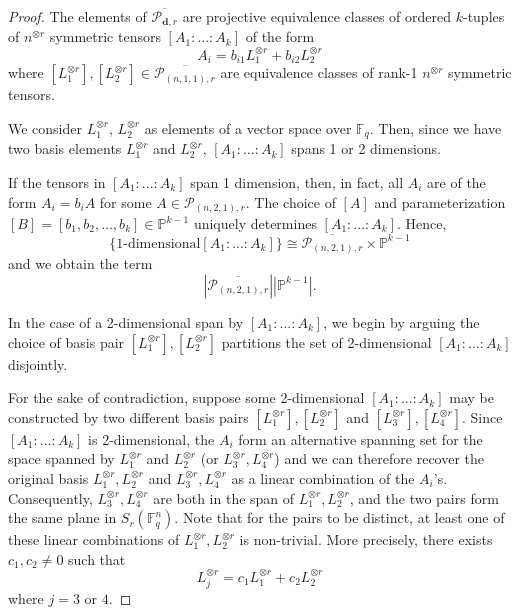 \documentclass[a4paper]{cas-sc}
\newcommand{\dd}{\mathbf{d}}    %
\newcommand{\F}{\mathbb{F}}
\begin{document}
    \begin{proof}
        The elements of $\overline{\mathcal{P}_{\dd, r}}$ are projective equivalence classes of ordered $k$-tuples of $n^{\otimes r}$ symmetric tensors $\left[A_1:...:A_k\right]$ of the form 
        $$A_i = b_{i1} L_1^{\otimes r} + b_{i2} L_2^{\otimes r}$$
        where $\left[L_1^{\otimes r}\right], \left[L_2^{\otimes r}\right] \in \overline{\mathcal{P}_{(n,1,1),r}}$ are equivalence classes of rank-1 $n^{\otimes r}$ symmetric tensors. 
    
        We consider $L_1^{\otimes r}$, $L_2^{\otimes r}$ as elements of a vector space over $\mathbb{F}_q$. Then, since we have two basis elements $L_1^{\otimes r}$ and $L_2^{\otimes r}$, $\left[A_1:...:A_k\right]$ spans 1 or 2 dimensions. 
    
        If the tensors in $\left[A_1:...:A_k\right]$ span 1 dimension, then, in fact, all $A_i$ are of the form
        $A_i = b_iA$
        for some $A \in \mathcal{P}_{(n,2,1),r}$. The choice of $\left[A\right]$ and parameterization $\left[B\right] = \left[b_1, b_2, ..., b_k\right] \in \mathbb{P}^{k-1}$ uniquely determines $\left[A_1:...:A_k\right]$. Hence, 
        $$\{\text{1-dimensional} \left[A_1:...:A_k\right]\} \cong \overline{\mathcal{P}_{(n,2,1), r}} \times \mathbb{P}^{k-1}$$ 
        and we obtain the term
        $$\left|\overline{\mathcal{P}_{(n,2,1), r}}\right| \left|\mathbb{P}^{k-1}\right|.$$
    
        In the case of a 2-dimensional span by $\left[A_1:...:A_k\right]$, we begin by arguing the choice of basis pair $\left[L_1^{\otimes r}\right],\left[L_2^{\otimes r}\right]$ partitions the set of 2-dimensional $\left[A_1:...:A_k\right]$ disjointly.
        
        For the sake of contradiction, suppose some 2-dimensional $\left[A_1:...:A_k\right]$ may be constructed by two different basis pairs $\left[L_1^{\otimes r}\right],\left[L_2^{\otimes r}\right]$ and $\left[L_3^{\otimes r}\right],\left[L_4^{\otimes r}\right]$. Since $\left[A_1:...:A_k\right]$ is 2-dimensional, the $A_i$ form an alternative spanning set for the space spanned by $L_1^{\otimes r}$ and $L_2^{\otimes r}$ (or $ L_3^{\otimes r}, L_4^{\otimes r}$) and we can therefore recover the original basis $L_1^{\otimes r},L_2^{\otimes r}$ and $ L_3^{\otimes r}, L_4^{\otimes r}$ as a linear combination of the $A_i$'s. Consequently, $L_3^{\otimes r}, L_4^{\otimes r}$ are both in the span of $L_1^{\otimes r},L_2^{\otimes r}$, and the two pairs form the same plane in $S_r(\F_q^n)$. Note that for the pairs to be distinct, at least one of these linear combinations of $L_1^{\otimes r},L_2^{\otimes r}$ is non-trivial. More precisely, there exists $c_1,c_2 \neq 0$ such that
        $$L_j^{\otimes r} = c_1L_1^{\otimes r} + c_2L_2^{\otimes r}$$
        where $j = 3$ or $4$.


\end{proof}
\end{document}
